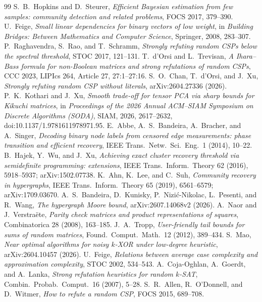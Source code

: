 \documentclass[11pt]{article}
\theoremstyle{definition}
\theoremstyle{remark}
\newcommand{\1}{\mathbf 1}
\numberwithin{equation}{section}
\begin{document}
\begin{thebibliography}{99}
 S.~B.~Hopkins and D.~Steurer, \emph{Efficient Bayesian estimation from few samples: community detection and related problems}, FOCS 2017, 379--390.
 U.~Feige, \emph{Small linear dependencies for binary vectors of low weight}, in \emph{Building Bridges: Between Mathematics and Computer Science}, Springer, 2008, 283--307.
 P.~Raghavendra, S.~Rao, and T.~Schramm, \emph{Strongly refuting random CSPs below the spectral threshold}, STOC 2017, 121--131.
 T.~d'Orsi and L.~Trevisan, \emph{A Ihara--Bass formula for non-Boolean matrices and strong refutations of random CSPs}, CCC 2023, LIPIcs 264, Article 27, 27:1--27:16.
 S.~O.~Chan, T.~d'Orsi, and J.~Xu, \emph{Strongly refuting random CSP without literals}, arXiv:2604.27336 (2026).
 P.~K.~Kothari and J.~Xu, \emph{Smooth trade-off for tensor PCA via sharp bounds for Kikuchi matrices}, in \emph{Proceedings of the 2026 Annual ACM--SIAM Symposium on Discrete Algorithms (SODA)}, SIAM, 2026, 2617--2632, doi:10.1137/1.9781611978971.95.
 E.~Abbe, A.~S.~Bandeira, A.~Bracher, and A.~Singer, \emph{Decoding binary node labels from censored edge measurements: phase transition and efficient recovery}, IEEE Trans.\ Netw.\ Sci.\ Eng.\ 1 (2014), 10--22.
 B.~Hajek, Y.~Wu, and J.~Xu, \emph{Achieving exact cluster recovery threshold via semidefinite programming: extensions}, IEEE Trans.\ Inform.\ Theory 62 (2016), 5918--5937; arXiv:1502.07738.
 K.~Ahn, K.~Lee, and C.~Suh, \emph{Community recovery in hypergraphs}, IEEE Trans.\ Inform.\ Theory 65 (2019), 6561--6579; arXiv:1709.03670.
 A.~S.~Bandeira, D.~Kunisky, P.~Nizi\'c-Nikolac, L.~Pesenti, and R.~Wang, \emph{The hypergraph Moore bound}, arXiv:2607.14068v2 (2026).
 A.~Naor and J.~Verstra\"ete, \emph{Parity check matrices and product representations of squares}, Combinatorica 28 (2008), 163--185.
 J.~A.~Tropp, \emph{User-friendly tail bounds for sums of random matrices}, Found.\ Comput.\ Math.\ 12 (2012), 389--434.
 S.~Mao, \emph{Near optimal algorithms for noisy $k$-XOR under low-degree heuristic}, arXiv:2604.10457 (2026).
 U.~Feige, \emph{Relations between average case complexity and approximation complexity}, STOC 2002, 534--543.
 A.~Coja-Oghlan, A.~Goerdt, and A.~Lanka, \emph{Strong refutation heuristics for random $k$-SAT}, Combin.\ Probab.\ Comput.\ 16 (2007), 5--28.
 S.~R.~Allen, R.~O'Donnell, and D.~Witmer, \emph{How to refute a random CSP}, FOCS 2015, 689--708.

\end{thebibliography}
\end{document}
